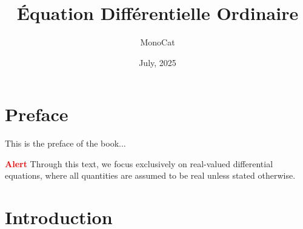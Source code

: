 \documentclass[11pt]{elegantbook}
\title{Équation Différentielle Ordinaire} %
\author{MonoCat} %
\date{July, 2025} %
\begin{document}
\maketitle %

\frontmatter        %
\tableofcontents    %

\chapter{Preface}   %
This is the preface of the book...

\textcolor{red}{\bfseries Alert} Through this text, we focus exclusively on real-valued differential equations, 
where all quantities are assumed to be real unless stated otherwise. 
\mainmatter         %

\chapter{Introduction} %
\end{document}

